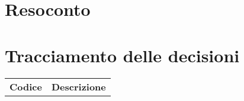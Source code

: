 \documentclass{article}
\begin{document}
\section{Resoconto}%
\label{resoconto}


\section{Tracciamento delle decisioni}
\begin{table}[H]
  \centering
  \begin{tabular}{p{4cm}|p{12cm}}
    \rowcolor{lightgray}
    \textbf{Codice}  & \textbf{Descrizione}      \\
  \end{tabular}
\end{table}
\end{document}
